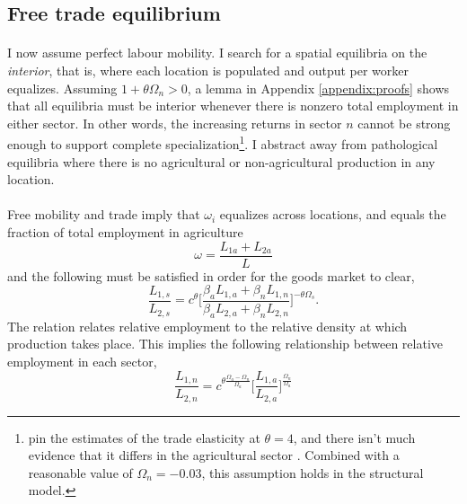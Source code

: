 \documentclass[]{article}
\theoremstyle{plain}
\begin{document}
\subsection*{Free trade equilibrium} 
\paragraph*{}
I now assume perfect labour mobility. I search for a spatial equilibria on the \textit{interior}, that is, where each location is populated and output per worker equalizes.  Assuming $1 + \theta\Omega_{n} > 0$, a lemma in Appendix \ref{appendix:proofs} shows that all equilibria must be interior whenever there is nonzero total employment in either sector. In other words, the increasing returns in sector $n$ cannot be strong enough to support complete specialization\footnote{\citet{sw2014} pin the estimates of the trade elasticity at $\theta = 4$, and there isn't much evidence that it differs in the agricultural sector \citep{tombe2015}. Combined with a reasonable value of $\Omega_{n} = -0.03$, this assumption holds in the structural model.}. I abstract away from pathological equilibria where there is no agricultural or non-agricultural production in any location.
\paragraph*{}
Free mobility and trade imply that $\omega_{i}$ equalizes across locations, and equals the fraction of total employment in agriculture
\begin{equation}\label{employmentag}
	\omega = \frac{L_{1a} + L_{2a}}{L}
\end{equation}
and the following must be satisfied in order for the goods market to clear,
\begin{equation}\label{densityclear}
	\frac{L_{1, s}}{L_{2, s}} = c^{\theta}\bigg[\frac{\beta_{a}L_{1, a} + \beta_{n}L_{1, n}}{\beta_{a}L_{2, a} + \beta_{n}L_{2, n}}\bigg]^{-\theta\Omega_{s}}.
\end{equation}
The relation relates relative employment to the relative density at which production takes place. This implies the following relationship between relative employment in each sector, 
\begin{equation} \label{spec}
	\frac{L_{1,n}}{L_{2, n}} = c^{\theta\frac{\Omega_{a} - \Omega_{n}}{\Omega_{a}}}\bigg[\frac{L_{1,a}}{L_{2,a}}\bigg]^{\frac{\Omega_{n}}{\Omega_{a}}}
\end{equation}
\end{document}
